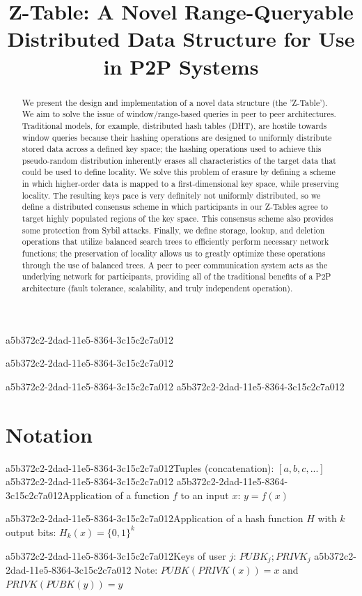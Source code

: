 \documentclass[12pt]{article}
\title{Z-Table: A Novel Range-Queryable Distributed Data Structure for Use in P2P Systems}
\begin{document}
a5b372c2-2dad-11e5-8364-3c15c2c7a012
\maketitle

a5b372c2-2dad-11e5-8364-3c15c2c7a012\begin{abstract}
We present the design and implementation of a novel data structure (the 'Z-Table'). We aim to solve the issue of window/range-based queries in peer to peer architectures. Traditional models, for example,  distributed hash tables (DHT), are hostile towards window queries because their hashing operations are designed to uniformly distribute stored data across a defined key space; the hashing operations used to achieve this pseudo-random distribution inherently erases all characteristics of the target data that could be used to define locality. We solve this problem of erasure by defining a scheme in which higher-order data is mapped to a first-dimensional key space, while preserving locality. The resulting keys pace is very definitely not uniformly distributed, so we define a distributed consensus scheme in which participants in our Z-Tables agree to target highly populated regions of the key space. This consensus scheme also provides some protection from Sybil attacks. Finally, we define storage, lookup, and deletion operations that utilize balanced search trees to efficiently perform necessary network functions; the preservation of locality allows us to greatly optimize these operations through the use of balanced trees. A peer to peer communication system acts as the underlying network for participants, providing all of the traditional benefits of a P2P architecture (fault tolerance, scalability, and truly independent operation).
\end{abstract}
a5b372c2-2dad-11e5-8364-3c15c2c7a012
a5b372c2-2dad-11e5-8364-3c15c2c7a012\section{Notation}

a5b372c2-2dad-11e5-8364-3c15c2c7a012Tuples (concatenation): $[a,b,c,...]$
a5b372c2-2dad-11e5-8364-3c15c2c7a012
a5b372c2-2dad-11e5-8364-3c15c2c7a012Application of a function $f$ to an input $x$: $y=f(x)$

a5b372c2-2dad-11e5-8364-3c15c2c7a012Application of a hash function $H$ with $k$ output bits: $H_{k}(x) = \{0,1\}^k$

a5b372c2-2dad-11e5-8364-3c15c2c7a012Keys of user $j$: $ PUBK_j; PRIVK_j $
a5b372c2-2dad-11e5-8364-3c15c2c7a012
Note: $PUBK(PRIVK(x)) = x$ and $PRIVK(PUBK(y)) = y$~
\end{document}
